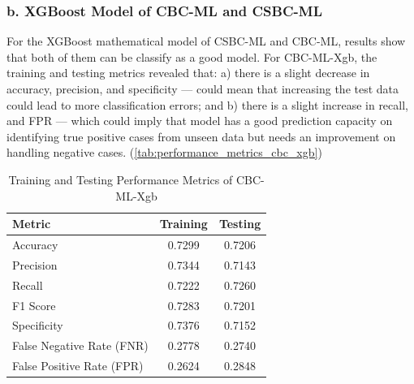  \subsubsection*{b. XGBoost Model of CBC-ML and CSBC-ML}
For the XGBoost mathematical model of CSBC-ML and CBC-ML, results show that both of them can be classify as a good model. For CBC-ML-Xgb, the training and testing metrics revealed that: a) there is a slight decrease in accuracy, precision, and specificity --- could mean that increasing the test data could lead to more classification errors; and b) there is a slight increase in recall, and FPR --- which could imply that model has a good prediction capacity on identifying true positive cases from unseen data but needs an improvement on handling negative cases. (\autoref{tab:performance_metrics_cbc_xgb})  




\begin{table}[h]
\centering
\small
\renewcommand{\arraystretch}{1.2} %

\begin{tabular}{l c c}
\hline
\textbf{Metric} & \textbf{Training} & \textbf{Testing} \\
\hline
Accuracy & 0.7299 & 0.7206 \\
Precision & 0.7344 & 0.7143 \\
Recall & 0.7222 & 0.7260 \\
F1 Score & 0.7283 & 0.7201 \\
Specificity & 0.7376 & 0.7152 \\
False Negative Rate (FNR) & 0.2778 & 0.2740 \\
False Positive Rate (FPR) & 0.2624 & 0.2848 \\
\hline
\end{tabular}

\caption{Training and Testing Performance Metrics of CBC-ML-Xgb}
\label{tab:performance_metrics_cbc_xgb}
\end{table}


